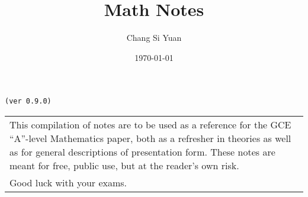 \documentclass[../main]{subfiles}
\begin{document}
\author{Chang Si Yuan}
\title{Math Notes}
\date{\today}

\maketitle

\begin{center}

	\texttt{(ver 0.9.0)}

	\vspace{50pt}

	\begin{tabular}{>{\flushleft}p{8cm}}
	This compilation of notes are to be used as a reference for the GCE ``A''-level Mathematics paper, both as a refresher in theories as well as for general descriptions of presentation form. These notes are meant for free, public use, but at the reader's own risk. \\
	Good luck with your exams.
	\end{tabular}

	\vspace{50pt}

\end{center}

\newpage
\end{document}
